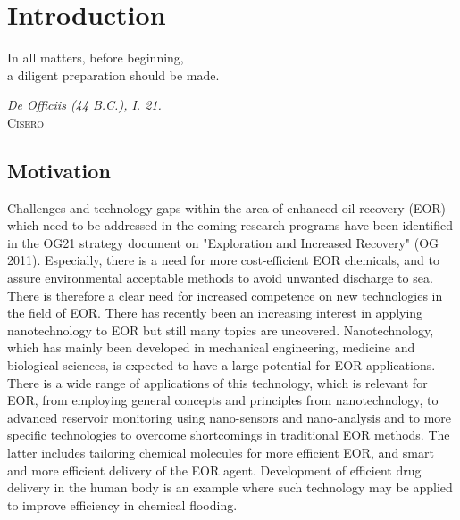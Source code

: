 \chapter{Introduction}
\vspace*{\fill}
\epigraph{In all matters, before beginning,\\ a diligent preparation should be made.}%
{\textit{De Officiis (44 B.C.), I. 21.}\\ \textsc{Cisero}}
\clearpage{\thispagestyle{empty}\cleardoublepage}
\section{Motivation}

Challenges and technology gaps within the area of enhanced oil recovery (EOR) which need to be addressed in the coming research programs have been identified in the OG21 strategy document on "Exploration and Increased Recovery" (OG 2011). Especially, there is a need for more cost-efficient EOR chemicals, and to assure environmental acceptable methods to avoid unwanted discharge to sea. There is therefore a clear need for increased competence on new technologies in the field of EOR. There has recently been an increasing interest in applying nanotechnology to EOR but still many topics are uncovered. Nanotechnology, which has mainly been developed in mechanical engineering, medicine and biological sciences, is expected to have a large potential for EOR applications. There is a wide range of applications of this technology, which is relevant for EOR, from employing general concepts and principles from nanotechnology, to advanced reservoir monitoring using nano-sensors and nano-analysis and to more specific technologies to overcome shortcomings in traditional EOR methods. The latter includes tailoring chemical molecules for more efficient EOR, and smart and more efficient delivery of the EOR agent. Development of efficient drug delivery in the human body is an example where such technology may be applied to improve efficiency in chemical flooding.


